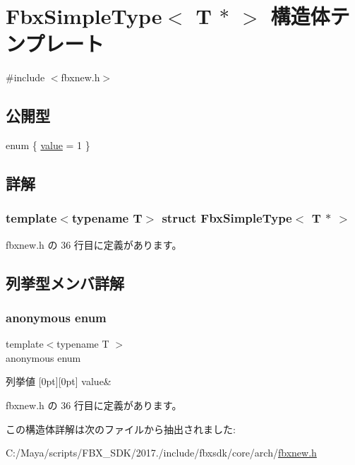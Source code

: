 \hypertarget{struct_fbx_simple_type_3_01_t_01_5_01_4}{}\section{Fbx\+Simple\+Type$<$ T $\ast$ $>$ 構造体テンプレート}
\label{struct_fbx_simple_type_3_01_t_01_5_01_4}


{\ttfamily \#include $<$fbxnew.\+h$>$}

\subsection*{公開型}
\begin{DoxyCompactItemize}
\item 
enum \{ \hyperlink{struct_fbx_simple_type_3_01_t_01_5_01_4_a69bce45e0e04d4577859d7f8a2f651cca620e3b3ec7cde5d1066733ba4ae1babe}{value} = 1
 \}
\end{DoxyCompactItemize}


\subsection{詳解}
\subsubsection*{template$<$typename T$>$\newline
struct Fbx\+Simple\+Type$<$ T $\ast$ $>$}



 fbxnew.\+h の 36 行目に定義があります。



\subsection{列挙型メンバ詳解}
\mbox{\label{struct_fbx_simple_type_3_01_t_01_5_01_4_a69bce45e0e04d4577859d7f8a2f651cc}} 
\subsubsection{\texorpdfstring{anonymous enum}{anonymous enum}}
{\footnotesize\ttfamily template$<$typename T $>$ \\
anonymous enum}

\begin{DoxyEnumFields}{列挙値}
[0pt][0pt]{}\mbox{\label{struct_fbx_simple_type_3_01_t_01_5_01_4_a69bce45e0e04d4577859d7f8a2f651cca620e3b3ec7cde5d1066733ba4ae1babe}} 
value&\\
\hline

\end{DoxyEnumFields}


 fbxnew.\+h の 36 行目に定義があります。



この構造体詳解は次のファイルから抽出されました\+:\begin{DoxyCompactItemize}
\item 
C\+:/\+Maya/scripts/\+F\+B\+X\+\_\+\+S\+D\+K/2017./include/fbxsdk/core/arch/\hyperlink{fbxnew_8h}{fbxnew.\+h}\end{DoxyCompactItemize}
